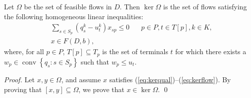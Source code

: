 \documentclass[smallcondensed]{svjour3}
\DeclareMathOperator*{\conv}{conv}
\begin{document}
\begin{theorem} \label{thm:kerpp}
Let $\Omega$ be the set of feasible flows in $D$.
Then $\ker\Omega$ is the set of flows satisfying the following homogeneous linear inequalities:
\begin{eqnarray}
           & \sum_{s\in S_p}\left(q_s^k-u_t^k\right)x_{sp}\leq 0~~~~ & p\in P, t\in T[p], k\in K, \label{eq:kerqual} \\
           & x\in F(D,b), \label{eq:kerflow}
\end{eqnarray}
where, for all $p\in P$, $T[p]\subseteq T_p$ is the set of terminals $t$
for which there exists a $w_p\in\conv\left\{q_s:s\in S_p\right\}$ such that $w_p\leq u_t$.
\end{theorem}
\begin{proof}
Let $x,y\in\Omega$, and assume $x$ satisfies (\ref{eq:kerqual})--(\ref{eq:kerflow}).
By proving that $[x,y]\subseteq\Omega$, we prove that $x\in\ker\Omega$.
\qed
\end{proof}
\end{document}
